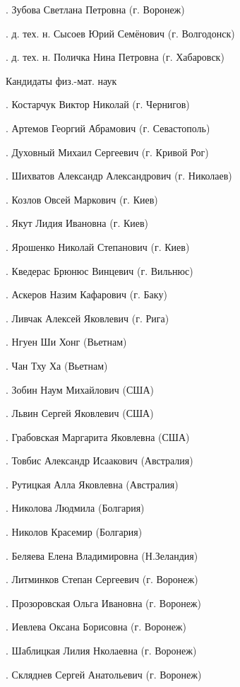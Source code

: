 .	 Зубова Светлана Петровна (г. Воронеж)

.	 д. тех. н. Сысоев Юрий Семёнович (г. Волгодонск)

.	 д. тех. н. Поличка Нина Петровна (г. Хабаровск)

                     Кандидаты физ.-мат. наук

.	Костарчук Виктор Николай (г. Чернигов)

.	Артемов Георгий Абрамович (г. Севастополь)

.	Духовный Михаил Сергеевич (г. Кривой Рог)

.	Шихватов Александр Александрович (г. Николаев)

.	Козлов Овсей Маркович (г. Киев)

.	Якут Лидия Ивановна (г. Киев)

.	Ярошенко Николай Степанович (г. Киев)

.	Кведерас Брюнюс Винцевич (г. Вильнюс)

.	Аскеров Назим Кафарович (г. Баку)

.	Ливчак Алексей Яковлевич (г. Рига)

.	Нгуен Ши Хонг   (Вьетнам)

.	Чан Тху Ха (Вьетнам)

.	Зобин Наум Михайлович (США)

.	Львин Сергей Яковлевич (США)

.	Грабовская Маргарита Яковлевна (США)

.	Товбис Александр Исаакович (Австралия)

.	Рутицкая Алла Яковлевна (Австралия)

.	Николова Людмила (Болгария)

.	Николов Красемир (Болгария)

.	Беляева Елена Владимировна (Н.Зеландия)

.	Литминков Степан Сергеевич (г. Воронеж)

.	Прозоровская Ольга Ивановна (г. Воронеж)

.	Иевлева Оксана Борисовна (г. Воронеж)

.	Шаблицкая Лилия Нколаевна (г. Воронеж)

.	Скляднев Сергей Анатольевич (г. Воронеж)

